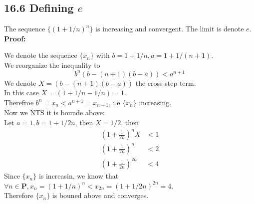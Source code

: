 \documentclass{article}
\begin{document}
\subsection*{16.6 Defining $e$}
The sequence $\{(1 + 1/n)^n\}$ is increasing and convergent. The limit is denote $e$.\\
\textbf{Proof:}
\begin{addmargin}[1em]{0em}
    We denote the sequence $\{x_n\}$ with $b = 1+1/n, a = 1+1/(n+1)$.\\
    We reorganize the inequality to
    \begin{equation*}
        b^n(b - (n+1)(b-a)) < a^{n+1}
    \end{equation*}
    We denote $X = (b - (n+1)(b-a))$ the cross step term.\\
    In this case $X = (1+1/n - 1/n) = 1$.\\
    Therefroe $b^n = x_n < a^{n+1} = x_{n+1}$, i.e $\{x_n\}$ increasing.\\
    Now we NTS it is bounde above:\\
    Let $a = 1, b = 1 + 1/2n$, then $X = 1/2$, then
    \begin{equation*}
        \begin{split}
            \left(1 + \frac{1}{2n}\right) ^ n  X &< 1\\
            \left(1 + \frac{1}{2n}\right) ^ n &< 2\\
            \left(1 + \frac{1}{2n}\right) ^ {2n} &< 4
        \end{split}
    \end{equation*}
    Since $\{x_n\}$ is increasin, we know that $\forall n \in \mathbf{P}, x_n = (1+1/n)^n < x_{2n} = (1+1/2n)^{2n} = 4$.\\
    Therefore $\{x_n\}$ is bouned above and converges.
\end{addmargin}
\end{document}
